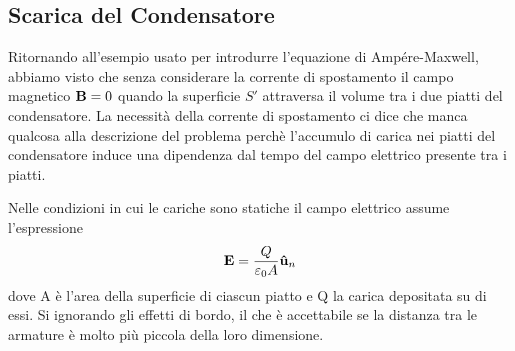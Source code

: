 \subsection{Scarica del Condensatore }

Ritornando all'esempio usato per introdurre l'equazione di Amp\'ere-Maxwell, abbiamo visto che senza considerare la corrente di spostamento il campo magnetico $\bold{B} = 0$ quando la superficie $S'$ attraversa il volume tra i due piatti del condensatore. La necessit\`a della corrente di spostamento ci dice che manca qualcosa alla descrizione del problema perch\`e l'accumulo di carica nei piatti del condensatore induce una dipendenza dal tempo del campo elettrico presente tra i piatti.

Nelle condizioni in cui le cariche sono statiche il campo elettrico assume l'espressione
\begin{equation*}
	\bold{E} = \frac{Q}{\varepsilon_0 A}\bold{\hat{u}}_n
\end{equation*}
dove A \`e l'area della superficie di ciascun piatto e Q la carica depositata su di essi. Si ignorando gli effetti di bordo, il che \`e accettabile se la distanza tra le armature \`e molto pi\`u piccola della loro dimensione.
 
